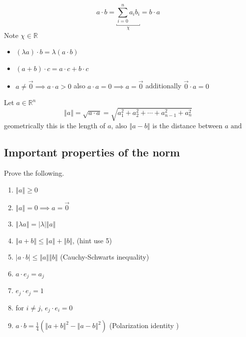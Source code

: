 \documentclass[11pt]{book}
\begin{document}
\begin{defn}\label{defn:dot_product}
    \[
    a \cdot b = \underbracket{\sum_{i=0}^{n} a_{i} b_{i}}_{\chi}  = b \cdot a 
    \]
    Note $\chi \in \mathbb{R} $ 
\end{defn}

\begin{itemize}
    \item $\left( \lambda a \right)  \cdot b= \lambda \left( a  \cdot b \right) $ 
    \item $\left( a + b \right)  \cdot c= a \cdot c + b \cdot c$ 
    \item $a\neq \vec{0} \implies a \cdot a > 0$ also $a \cdot a = 0 \implies a = \vec{0} $ additionally $\vec{0}  \cdot a = 0$ 
\end{itemize}

\begin{defn}[Norm]\label{defn:norm}
    Let $a \in \mathbb{R}^{n}  $ 
    \[
    \left\Vert a \right\Vert = \sqrt{a \cdot a} = \sqrt{a_{1}^2   +  a_{2}^2   +  \dotsb   +  a_{n - 1}^2   +  a_{n}^2  } 
    \]
    geometrically this is the length of $a$, also $\left\Vert a - b \right\Vert $ is the distance between $a \text{ and } $ 
\end{defn}



\subsection{Important properties of the norm}%
\label{sub:important_properties_of_the_norm}

Prove the following.
\begin{enumerate}
    \item $\left\Vert a \right\Vert \ge 0$ 
    \item $\left\Vert a \right\Vert = 0 \implies a = \vec{0} $ 
    \item $\left\Vert \lambda a \right\Vert = \left| \lambda  \right| \left\Vert a \right\Vert  $ 
    \item $\left\Vert a + b \right\Vert \le \left\Vert a \right\Vert  + \left\Vert b \right\Vert $, (hint use 5)
    \item $\left| a \cdot b \right| \le \left\Vert a \right\Vert \left\Vert b \right\Vert $ (Cauchy-Schwarts inequality)
    \item $a \cdot e_{j} = a_{j} $ 
    \item $e_{j}  \cdot e_{j} = 1$ 
    \item for $i\neq j$,  $e_{j}  \cdot e_{i} = 0$ 
    \item $a \cdot b = \frac{1}{4}\left( \left\Vert a + b \right\Vert ^2  - \left\Vert a - b \right\Vert ^2  \right) $ (Polarization identity )
\end{enumerate}
\end{document}
